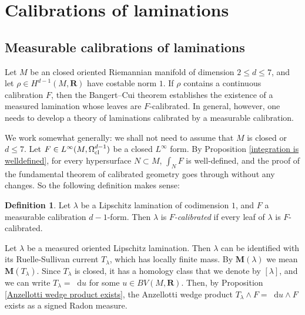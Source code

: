 \documentclass[reqno,11pt]{amsart}
\newcommand{\RR}{\mathbf{R}}
\newcommand*\dif{\mathop{}\!\mathrm{d}}
\newcommand{\Mass}{\mathbf M}
\newcommand{\dfn}[1]{\emph{#1}\index{#1}}
\theoremstyle{definition}
\newtheorem{definition}[theorem]{Definition}
\numberwithin{equation}{section}
\begin{document}
\section{Calibrations of laminations}\label{comass sec}
\subsection{Measurable calibrations of laminations}\label{L infinity calibrations}
Let $M$ be an closed oriented Riemannian manifold of dimension $2 \leq d \leq 7$, and let $\rho \in H^{d - 1}(M, \RR)$ have costable norm $1$.
If $\rho$ contains a continuous calibration $F$, then the Bangert--Cui theorem \cite{bangert_cui_2017} establishes the existence of a measured lamination whose leaves are $F$-calibrated.
In general, however, one needs to develop a theory of laminations calibrated by a measurable calibration.

We work somewhat generally: we shall not need to assume that $M$ is closed or $d \leq 7$.
Let $F \in L^\infty(M, \Omega^{d - 1}_{\rm cl})$ be a closed $L^\infty$ form.
By Proposition \ref{integration is welldefined}, for every hypersurface $N \subset M$, $\int_N F$ is well-defined, and the proof of the fundamental theorem of calibrated geometry goes through without any changes.
So the following definition makes sense:

\begin{definition}
Let $\lambda$ be a Lipschitz lamination of codimension $1$, and $F$ a measurable calibration $d - 1$-form.
Then $\lambda$ is \dfn{$F$-calibrated} if every leaf of $\lambda$ is $F$-calibrated.
\end{definition}

Let $\lambda$ be a measured oriented Lipschitz lamination.
Then $\lambda$ can be identified with its Ruelle-Sullivan current $T_\lambda$, which has locally finite mass.
By $\Mass(\lambda)$ we mean $\Mass(T_\lambda)$.
Since $T_\lambda$ is closed, it has a homology class that we denote by $[\lambda]$, and we can write $T_\lambda = \dif u$ for some $u \in BV(M, \RR)$.
Then, by Proposition \ref{Anzellotti wedge product exists}, the Anzellotti wedge product $T_\lambda \wedge F = \dif u \wedge F$ exists as a signed Radon measure.
\end{document}
